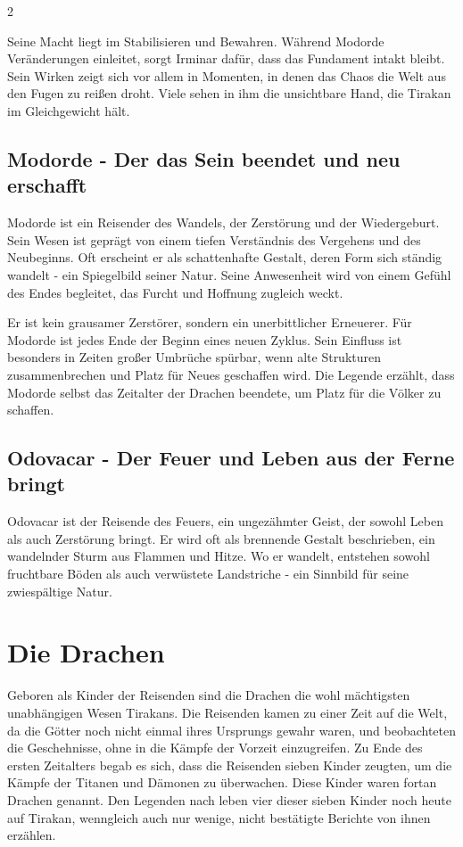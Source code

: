 \begin{multicols}{2}
{Seine Macht liegt im Stabilisieren und Bewahren.
Während Modorde Veränderungen einleitet, sorgt Irminar dafür, dass das Fundament intakt bleibt.
Sein Wirken zeigt sich vor allem in Momenten, in denen das Chaos die Welt aus den Fugen zu reißen droht.
Viele sehen in ihm die unsichtbare Hand, die Tirakan im Gleichgewicht hält.

\subsection{Modorde - Der das Sein beendet und neu erschafft}\label{subsec:modorde-der-das-sein-beendet-und-neu-erschafft}

Modorde ist ein Reisender des Wandels, der Zerstörung und der Wiedergeburt.
Sein Wesen ist geprägt von einem tiefen Verständnis des Vergehens und des Neubeginns.
Oft erscheint er als schattenhafte Gestalt, deren Form sich ständig wandelt - ein Spiegelbild seiner Natur.
Seine Anwesenheit wird von einem Gefühl des Endes begleitet, das Furcht und Hoffnung zugleich weckt.

Er ist kein grausamer Zerstörer, sondern ein unerbittlicher Erneuerer.
Für Modorde ist jedes Ende der Beginn eines neuen Zyklus.
Sein Einfluss ist besonders in Zeiten großer Umbrüche spürbar, wenn alte Strukturen zusammenbrechen und Platz für Neues geschaffen wird.
Die Legende erzählt, dass Modorde selbst das Zeitalter der Drachen beendete, um Platz für die Völker zu schaffen.


\subsection{Odovacar - Der Feuer und Leben aus der Ferne bringt}\label{subsec:odovacar-der-feuer-und-leben-aus-der-ferne-bringt}

Odovacar ist der Reisende des Feuers, ein ungezähmter Geist, der sowohl Leben als auch Zerstörung bringt.
Er wird oft als brennende Gestalt beschrieben, ein wandelnder Sturm aus Flammen und Hitze.
Wo er wandelt, entstehen sowohl fruchtbare Böden als auch verwüstete Landstriche - ein Sinnbild für seine zwiespältige Natur.


\section{Die Drachen}\label{sec:die-drachen}

Geboren als Kinder der Reisenden sind die Drachen die wohl mächtigsten unabhängigen Wesen Tirakans.
Die Reisenden kamen zu einer Zeit auf die Welt, da die Götter noch nicht einmal ihres Ursprungs gewahr waren, und beobachteten die Geschehnisse, ohne in die Kämpfe der Vorzeit einzugreifen.
Zu Ende des ersten Zeitalters begab es sich, dass die Reisenden sieben Kinder zeugten, um die Kämpfe der Titanen und Dämonen zu überwachen.
Diese Kinder waren fortan Drachen genannt.
Den Legenden nach leben vier dieser sieben Kinder noch heute auf Tirakan, wenngleich auch nur wenige, nicht bestätigte Berichte von ihnen erzählen.

}
\end{multicols}
